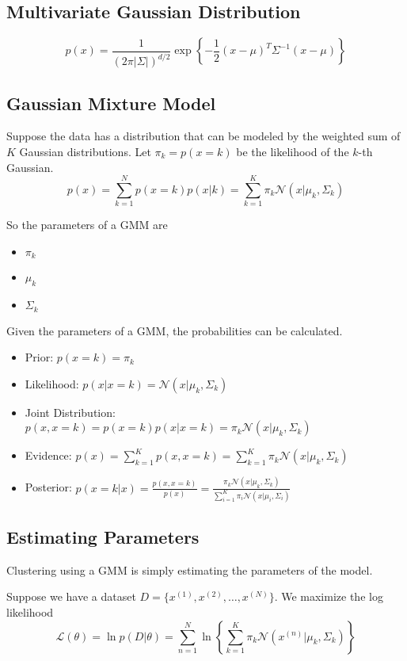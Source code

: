     \subsection{Multivariate Gaussian Distribution}
        \[ p(x) = \frac{1}{(2\pi|\Sigma|)^{d/2}}\exp\left\{ -\frac{1}{2}(x-\mu)^T\Sigma^{-1}(x-\mu) \right\} \]

    \subsection{Gaussian Mixture Model}
        Suppose the data has a distribution that can be modeled by the weighted sum of $K$ Gaussian distributions. Let $\pi_k = p(x=k)$ be the likelihood of the $k$-th Gaussian.
        \[ p(x) = \sum_{k=1}^Np(x=k)p(x|k) = \sum_{k=1}^K\pi_k \mathcal{N}(x|\mu_k,\Sigma_k) \]

        So the parameters of a GMM are
        \begin{itemize}
            \item $\pi_k$
            \item $\mu_k$
            \item $\Sigma_k$
        \end{itemize}

        Given the parameters of a GMM, the probabilities can be calculated.
        \begin{itemize}
            \item Prior: $p(x=k)=\pi_k$
            \item Likelihood: $p(x|x=k)=\mathcal{N}(x|\mu_k,\Sigma_k)$
            \item Joint Distribution: $p(x,x=k)=p(x=k)p(x|x=k)=\pi_k\mathcal{N}(x|\mu_k,\Sigma_k)$
            \item Evidence: $p(x) = \sum_{k=1}^Kp(x,x=k)=\sum_{k=1}^K\pi_k\mathcal{N}(x|\mu_k,\Sigma_k)$
            \item Posterior: $p(x=k|x)=\frac{p(x,x=k)}{p(x)}=\frac{\pi_k\mathcal{N}(x|\mu_k,\Sigma_k)}{\sum_{i=1}^K\pi_i\mathcal{N}(x|\mu_i,\Sigma_i)}$
        \end{itemize}

    \subsection{Estimating Parameters}
        Clustering using a GMM is simply estimating the parameters of the model.

        Suppose we have a dataset $D = \{x^{(1)},x^{(2)},\dots,x^{(N)}\}$. We maximize the log likelihood
        \[ \mathcal{L}(\theta) = \ln p(D|\theta) = \sum_{n=1}^N\ln\left\{\sum_{k=1}^K\pi_k\mathcal{N}(x^{(n)}|\mu_k,\Sigma_k)\right\} \]

